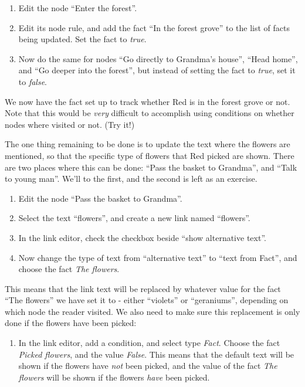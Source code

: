 \documentclass{article}
\begin{document}
\begin{enumerate}
  \item Edit the node ``Enter the forest''.
  \item Edit its node rule, and add the fact ``In the forest grove'' to the
  list of facts being updated. Set the fact to \textit{true}.
  \item Now do the same for nodes ``Go directly to Grandma's house'', ``Head
  home'', and ``Go deeper into the forest'', but instead of setting the fact to
  \textit{true}, set it to \textit{false}.
\end{enumerate}

We now have the fact set up to track whether Red is in the forest grove or not.
Note that this would be \textit{very} difficult to accomplish using conditions
on whether nodes where visited or not. (Try it!)

The one thing remaining to be done is to update the text where the flowers are
mentioned, so that the specific type of flowers that Red picked are shown.
There are two places where this can be done: ``Pass the basket to Grandma'',
and ``Talk to young man''. We'll to the first, and the second is left as an
exercise.

\begin{enumerate}
  \item Edit the node ``Pass the basket to Grandma''.
  \item Select the text ``flowers'', and create a new link named ``flowers''.
  \item In the link editor, check the checkbox beside ``show alternative text''.
  \item Now change the type of text from ``alternative text'' to ``text from
  Fact'', and choose the fact \textit{The flowers}.
\end{enumerate}

This means that the link text will be replaced by whatever value for the fact
``The flowers'' we have set it to - either ``violets'' or ``geraniums'',
depending on which node the reader visited. We also need to make sure this
replacement is only done if the flowers have been picked:

\begin{enumerate}
  \item In the link editor, add a condition, and select type \textit{Fact}.
  Choose the fact \textit{Picked flowers}, and the value \textit{False}. This
  means that the default text will be shown if the flowers have \textit{not}
  been picked, and the value of the fact \textit{The flowers} will be shown if
  the flowers \textit{have} been picked.
\end{enumerate}
\end{document}
